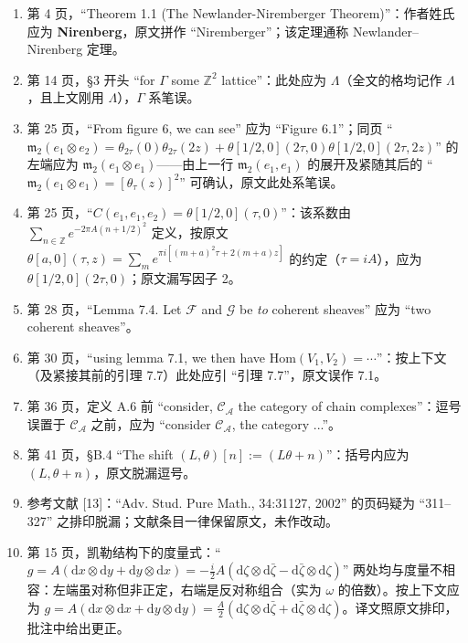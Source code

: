 \documentclass[11pt,a4paper]{article}
\theoremstyle{plain}
\theoremstyle{definition}
\begin{document}
\begin{enumerate}[label=(\arabic*),leftmargin=2.2em]
  \item 第 4 页，“Theorem 1.1 (The Newlander-Niremberger Theorem)”：作者姓氏应为 \textbf{Nirenberg}，原文拼作 “Niremberger”；该定理通称 Newlander--Nirenberg 定理。
  \item 第 14 页，§3 开头 “for $\Gamma$ some $\mathbb{Z}^2$ lattice”：此处应为 $\Lambda$（全文的格均记作 $\Lambda$，且上文刚用 $\Lambda$），$\Gamma$ 系笔误。
  \item 第 25 页，“From figure 6, we can see” 应为 “Figure 6.1”；同页 “$\mathfrak{m}_2(e_1\otimes e_2)=\theta_{2\tau}(0)\theta_{2\tau}(2z)+\theta[1/2,0](2\tau,0)\theta[1/2,0](2\tau,2z)$” 的左端应为 $\mathfrak{m}_2(e_1\otimes e_1)$——由上一行 $\mathfrak{m}_2(e_1,e_1)$ 的展开及紧随其后的 “$\mathfrak{m}_2(e_1\otimes e_1)=[\theta_\tau(z)]^2$” 可确认，原文此处系笔误。
  \item 第 25 页，“$C(e_1,e_1,e_2)=\theta[1/2,0](\tau,0)$”：该系数由 $\sum_{n\in\mathbb{Z}}e^{-2\pi A(n+1/2)^2}$ 定义，按原文 $\theta[a,0](\tau,z)=\sum_m e^{\pi i[(m+a)^2\tau+2(m+a)z]}$ 的约定（$\tau=iA$），应为 $\theta[1/2,0](2\tau,0)$；原文漏写因子 2。
  \item 第 28 页，“Lemma 7.4. Let $\mathcal{F}$ and $\mathcal{G}$ be \emph{to} coherent sheaves” 应为 “two coherent sheaves”。
  \item 第 30 页，“using lemma 7.1, we then have $\mathrm{Hom}(V_1,V_2)=\cdots$”：按上下文（及紧接其前的引理 7.7）此处应引 “引理 7.7”，原文误作 7.1。
  \item 第 36 页，定义 A.6 前 “consider, $\mathcal{C}_{\mathcal{A}}$ the category of chain complexes”：逗号误置于 $\mathcal{C}_{\mathcal{A}}$ 之前，应为 “consider $\mathcal{C}_{\mathcal{A}}$, the category ...”。
  \item 第 41 页，§B.4 “The shift $(L,\theta)[n]:=(L\theta+n)$”：括号内应为 $(L,\theta+n)$，原文脱漏逗号。
  \item 参考文献 [13]：“Adv. Stud. Pure Math., 34:31127, 2002” 的页码疑为 “311--327” 之排印脱漏；文献条目一律保留原文，未作改动。
  \item 第 15 页，凯勒结构下的度量式：“$g=A(\mathrm{d}x\otimes\mathrm{d}y+\mathrm{d}y\otimes\mathrm{d}x)=-\frac{i}{2}A(\mathrm{d}\zeta\otimes\mathrm{d}\bar\zeta-\mathrm{d}\bar\zeta\otimes\mathrm{d}\zeta)$” 两处均与度量不相容：左端虽对称但非正定，右端是反对称组合（实为 $\omega$ 的倍数）。按上下文应为 $g=A(\mathrm{d}x\otimes\mathrm{d}x+\mathrm{d}y\otimes\mathrm{d}y)=\frac{A}{2}(\mathrm{d}\zeta\otimes\mathrm{d}\bar\zeta+\mathrm{d}\bar\zeta\otimes\mathrm{d}\zeta)$。译文照原文排印，批注中给出更正。

\end{enumerate}
\end{document}

